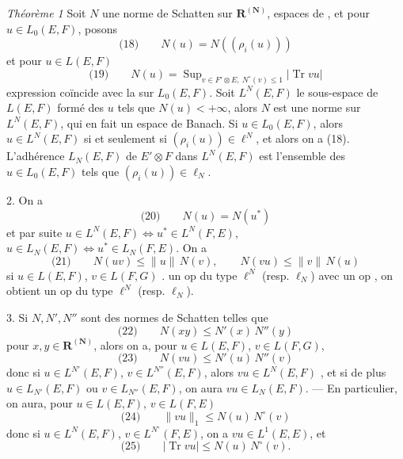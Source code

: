 \documentclass[11pt,a4paper]{article}
\begin{document}
\emph{Théorème 1}  Soit $N$ une norme de Schatten sur $\mathbf{R}^{(\mathbf{N})}$,  espaces de  , et pour $u \in L_0(E,F)$, posons
\[
  \text{(18)}\qquad N(u) = N((\rho_i(u)))
\]
et pour $u \in L(E,F)$
\[
  \text{(19)}\qquad N(u) = \operatorname{Sup}_{v \in F' \otimes E,\ N^{\circ}(v) \leq 1} |\operatorname{Tr} vu|
\]
  expression coïncide avec la  sur $L_0(E,F)$. Soit $L^N(E,F)$  le sous-espace de $L(E,F)$ formé des $u$ tels que $N(u) < +\infty$, alors $N$ est une norme sur $L^N(E,F)$, qui en fait un espace de Banach.   Si $u \in L_0(E,F)$, alors  $u \in L^N(E,F)$ si et seulement si $(\rho_i(u)) \in \ell^N$, et alors on a (18). L'adhérence $L_N(E,F)$ de $E' \otimes F$ dans $L^N(E,F)$ est l'ensemble des $u \in L_0(E,F)$ tels que $(\rho_i(u)) \in \ell_N$.

2. On a
\[
  \text{(20)}\qquad N(u) = N(u^{*})
\]
 et par suite $u \in L^N(E,F) \iff u^{*} \in L^N(F,E)$, $u \in L_N(E,F) \iff u^{*} \in L_N(F,E)$. On a
\[
  \text{(21)}\qquad N(uv) \leq \|u\|\,N(v), \qquad N(vu) \leq \|v\|\,N(u)
\]
si $u \in L(E,F)$, $v \in L(F,G)$ . \struck{\ill{}}  un op \struck{\ill{}} du type $\ell^N$ (resp. $\ell_N$) avec un op  \struck{\ill{}} , on obtient un op du type $\ell^N$ (resp. $\ell_N$). 


3.  Si $N, N', N''$ sont des normes de Schatten telles que
\[
  \text{(22)}\qquad N(xy) \leq N'(x)\,N''(y)
\]
 pour $x, y \in \mathbf{R}^{(\mathbf{N})}$, alors on a, pour $u \in L(E,F)$, $v \in L(F,G)$,
\[
  \text{(23)}\qquad N(vu) \leq N'(u)\,N''(v)
\]
donc si $u \in L^{N'}(E,F)$, $v \in L^{N''}(E,F)$, alors $vu \in L^N(E,F)$ , et si de plus $u \in L_{N'}(E,F)$ ou $v \in L_{N''}(E,F)$, on aura $vu \in L_N(E,F)$. --- En particulier, on aura, pour $u \in L(E,F)$, $v \in L(F,E)$
\[
  \text{(24)}\qquad \|vu\|_1 \leq N(u)\,N^{\circ}(v)
\]
donc si $u \in L^N(E,F)$, $v \in L^{N^{\circ}}(F,E)$, on a $vu \in L^1(E,E)$, et
\[
  \text{(25)}\qquad |\operatorname{Tr} vu| \leq N(u)\,N^{\circ}(v) .
\]
\end{document}
